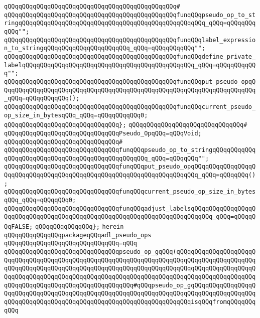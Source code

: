 \verb|qQQqqQQqqQQqqQQqqQQqqQQqqQQqqQQqqQQqqQQqqQQqqQQq#|\newline
\verb|qQQqqQQqqQQqqQQqqQQqqQQqqQQqqQQqqQQqqQQqqQQqqQQqfunqQQqpseudo_op_to_stringqQQqqQQqqQQqqQQqqQQqqQQqqQQqqQQqqQQqqQQqqQQqqQQqqQQq_qQQq=qQQqqQQqqQQq"";|\newline
\verb|qQQqqQQqqQQqqQQqqQQqqQQqqQQqqQQqqQQqqQQqqQQqqQQqfunqQQqlabel_expression_to_stringqQQqqQQqqQQqqQQqqQQqqQQq_qQQq=qQQqqQQqqQQq"";|\newline
\verb|qQQqqQQqqQQqqQQqqQQqqQQqqQQqqQQqqQQqqQQqqQQqqQQqfunqQQqdefine_private_labelqQQqqQQqqQQqqQQqqQQqqQQqqQQqqQQqqQQqqQQqqQQqqQQq_qQQq=qQQqqQQqqQQq"";|\newline
\verb|qQQqqQQqqQQqqQQqqQQqqQQqqQQqqQQqqQQqqQQqqQQqqQQqfunqQQqput_pseudo_opqQQqqQQqqQQqqQQqqQQqqQQqqQQqqQQqqQQqqQQqqQQqqQQqqQQqqQQqqQQqqQQqqQQqqQQq_qQQq=qQQqqQQqqQQq();|\newline
\verb|qQQqqQQqqQQqqQQqqQQqqQQqqQQqqQQqqQQqqQQqqQQqqQQqfunqQQqcurrent_pseudo_op_size_in_bytesqQQq_qQQq=qQQqqQQqqQQq0;|\newline
\verb|qQQqqQQqqQQqqQQqqQQqqQQqqQQqqQQq};|\newline
\verb|qQQqqQQqqQQqqQQqqQQqqQQqqQQqqQQq#|\newline
\verb|qQQqqQQqqQQqqQQqqQQqqQQqqQQqqQQqPseudo_OpqQQq=qQQqVoid;|\newline
\verb|qQQqqQQqqQQqqQQqqQQqqQQqqQQqqQQq#|\newline
\verb|qQQqqQQqqQQqqQQqqQQqqQQqqQQqqQQqfunqQQqpseudo_op_to_stringqQQqqQQqqQQqqQQqqQQqqQQqqQQqqQQqqQQqqQQqqQQqqQQqqQQq_qQQq=qQQqqQQq"";|\newline
\verb|qQQqqQQqqQQqqQQqqQQqqQQqqQQqqQQqfunqQQqput_pseudo_opqQQqqQQqqQQqqQQqqQQqqQQqqQQqqQQqqQQqqQQqqQQqqQQqqQQqqQQqqQQqqQQqqQQqqQQq_qQQq=qQQqqQQq();|\newline
\verb|qQQqqQQqqQQqqQQqqQQqqQQqqQQqqQQqfunqQQqcurrent_pseudo_op_size_in_bytesqQQq_qQQq=qQQqqQQq0;|\newline
\verb|qQQqqQQqqQQqqQQqqQQqqQQqqQQqqQQqfunqQQqadjust_labelsqQQqqQQqqQQqqQQqqQQqqQQqqQQqqQQqqQQqqQQqqQQqqQQqqQQqqQQqqQQqqQQqqQQqqQQqqQQq_qQQq=qQQqqQQqFALSE;|\newline
\verb|qQQqqQQqqQQqqQQq};|\newline
\verb|herein|\newline
\newline
\verb|qQQqqQQqqQQqqQQqpackageqQQqadl_pseudo_ops|\newline
\verb|qQQqqQQqqQQqqQQqqQQqqQQqqQQqqQQq=qQQq|\newline
\verb|qQQqqQQqqQQqqQQqqQQqqQQqqQQqqQQqpseudo_op_gqQQq(qQQqqQQqqQQqqQQqqQQqqQQqqQQqqQQqqQQqqQQqqQQqqQQqqQQqqQQqqQQqqQQqqQQqqQQqqQQqqQQqqQQqqQQqqQQqqQQqqQQqqQQqqQQqqQQqqQQqqQQqqQQqqQQqqQQqqQQqqQQqqQQqqQQqqQQqqQQqqQQqqQQqqQQqqQQqqQQqqQQqqQQqqQQqqQQqqQQqqQQqqQQqqQQqqQQqqQQqqQQqqQQqqQQqqQQqqQQqqQQqqQQqqQQqqQQqqQQqqQQqqQQqqQQq#qQQqpseudo_op_gqQQqqQQqqQQqqQQqqQQqqQQqqQQqqQQqqQQqqQQqqQQqqQQqqQQqqQQqqQQqqQQqqQQqqQQqqQQqqQQqqQQqqQQqqQQqqQQqqQQqqQQqqQQqqQQqqQQqqQQqqQQqqQQqqQQqqQQqqQQqisqQQqfromqQQqqQQqqQQq|\newline
